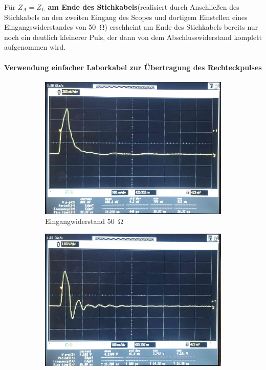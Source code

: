 \documentclass[a4paper,twoside,final]{article}
\begin{document}
Für \textbf{$Z_A = Z_L$ am Ende des Stichkabels}(realisiert durch Anschließen des Stichkabels an den zweiten Eingang des Scopes und dortigem Einstellen eines Eingangswiderstandes von \SI{50}{\ohm}) erschheint am Ende des Stichkabels bereits nur noch ein deutlich kleinerer Puls, der dann von dem Abschlusswiderstand komplett aufgenommen wird.\\

\paragraph{Verwendung einfacher Laborkabel zur Übertragung des Rechteckpulses}

\begin{figure}[htp]
    \centering
    \begin{subfigure}{0.45\textwidth}
        \includegraphics[width=\textwidth]{Bilder/Bild9.jpg}
        \caption{Eingangwiderstand \SI{50}{\ohm}}
    \end{subfigure}\hspace{1cm}
    \begin{subfigure}{0.45\textwidth}
        \includegraphics[width=\textwidth]{Bilder/Bild10.jpg}

\end{subfigure}
\end{figure}
\end{document}
